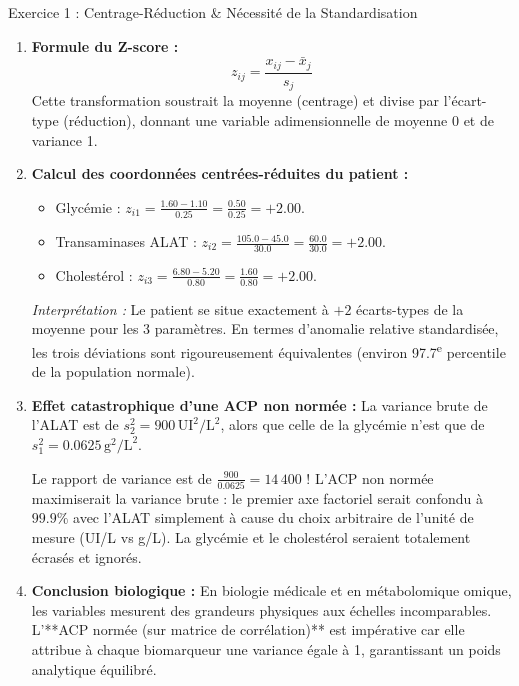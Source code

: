 \documentclass[11pt,a4paper]{article}
\begin{document}

\begin{solutionbox}{Exercice 1 : Centrage-Réduction \& Nécessité de la Standardisation}
\begin{enumerate}[label=\textbf{\alph*.}]
  \item \textbf{Formule du Z-score :}
  \begin{equation*}
    z_{ij} = \frac{x_{ij} - \bar{x}_j}{s_j}
  \end{equation*}
  Cette transformation soustrait la moyenne (centrage) et divise par l'écart-type (réduction), donnant une variable adimensionnelle de moyenne 0 et de variance 1.

  \item \textbf{Calcul des coordonnées centrées-réduites du patient :}
  \begin{itemize}
    \item Glycémie : $z_{i1} = \frac{1.60 - 1.10}{0.25} = \frac{0.50}{0.25} = \mathbf{+2.00}$.
    \item Transaminases ALAT : $z_{i2} = \frac{105.0 - 45.0}{30.0} = \frac{60.0}{30.0} = \mathbf{+2.00}$.
    \item Cholestérol : $z_{i3} = \frac{6.80 - 5.20}{0.80} = \frac{1.60}{0.80} = \mathbf{+2.00}$.
  \end{itemize}
  \textit{Interprétation :} Le patient se situe exactement à $+2$ écarts-types de la moyenne pour les 3 paramètres. En termes d'anomalie relative standardisée, les trois déviations sont rigoureusement équivalentes (environ 97.7\textsuperscript{e} percentile de la population normale).

  \item \textbf{Effet catastrophique d'une ACP non normée :}
  La variance brute de l'ALAT est de $s_2^2 = 900\,\text{UI}^2/\text{L}^2$, alors que celle de la glycémie n'est que de $s_1^2 = 0.0625\,\text{g}^2/\text{L}^2$.
  \par Le rapport de variance est de $\frac{900}{0.0625} = 14\,400$ !
  L'ACP non normée maximiserait la variance brute : le premier axe factoriel serait confondu à $99.9\%$ avec l'ALAT simplement à cause du choix arbitraire de l'unité de mesure (UI/L vs g/L). La glycémie et le cholestérol seraient totalement écrasés et ignorés.

  \item \textbf{Conclusion biologique :}
  En biologie médicale et en métabolomique omique, les variables mesurent des grandeurs physiques aux échelles incomparables. L'**ACP normée (sur matrice de corrélation)** est impérative car elle attribue à chaque biomarqueur une variance égale à 1, garantissant un poids analytique équilibré.
\end{enumerate}
\end{solutionbox}
\end{document}
